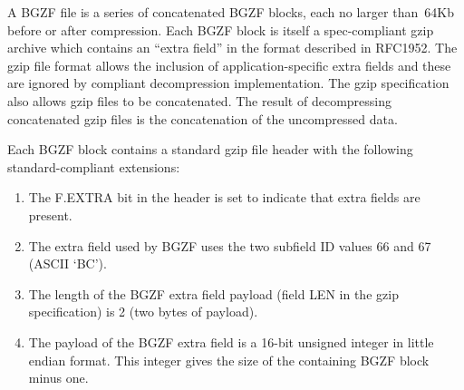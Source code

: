 \documentclass[10pt]{article}
\begin{document}
A BGZF file is a series of concatenated BGZF blocks, each no larger
than~64Kb before or after compression. Each BGZF block
is itself a spec-compliant gzip archive which contains an ``extra field''
in the format described in RFC1952. The gzip file format allows the
inclusion of application-specific extra fields and these are ignored by
compliant decompression implementation. The gzip specification also
allows gzip files to be concatenated. The result of decompressing
concatenated gzip files is the concatenation of the uncompressed data.

Each BGZF block contains a standard gzip file header with the following
standard-compliant extensions:

\begin{enumerate}
\item The {\sf F.EXTRA} bit in the header is set to indicate that extra
  fields are present.
\item The extra field used by BGZF uses the two subfield ID values 66 and 67 (ASCII `BC').
\item The length of the BGZF extra field payload (field {\sf LEN} in the
  gzip specification) is 2 (two bytes of payload).
\item The payload of the BGZF extra field is a 16-bit unsigned integer
  in little endian format. This integer gives the size of the containing
  BGZF block minus one.
\end{enumerate}
\end{document}
